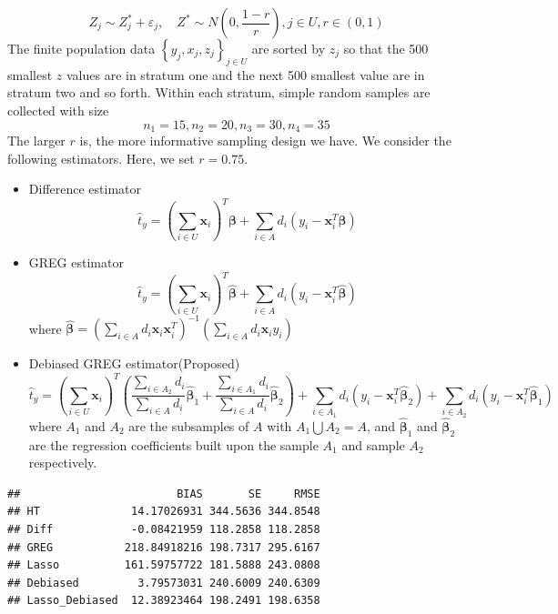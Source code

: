 \documentclass[12pt]{article}
\renewcommand{\bf}[1]{\boldsymbol{\mathbf{#1}}}
\newcommand{\set}[1]{\left\{#1\right\}} %
\newcommand{\pa}[1]{\left(#1\right)} %
\begin{document}
    $$
    Z_j \sim Z_j^* + \varepsilon_j, \quad Z^* \sim N\pa{0, \frac{1 - r}{r}}, j \in U, r \in (0, 1)
    $$
    The finite population data $\set{y_j, x_j, z_j}_{j \in U}$ are sorted by $z_j$ so that the 500 smallest $z$ values are in stratum one and the next 500 smallest value are in stratum two and so forth. Within each stratum, simple random samples are collected with size
    $$
    n_1 = 15, n_2 = 20, n_3 = 30, n_4 = 35
    $$
The larger $r$ is, the more informative sampling design we have. We consider the following estimators. Here, we set $r = 0.75$.

\begin{itemize}
  \item Difference estimator
  $$
  \hat t_y = \pa{\sum_{i \in U}\bf x_i}^T \bf \beta + \sum_{i \in A} d_i \pa{y_i - \bf x_i^T \bf \beta}
  $$
  \item GREG estimator
  $$
  \hat t_y = \pa{\sum_{i \in U}\bf x_i}^T \hat{\bf \beta} + \sum_{i \in A} d_i \pa{y_i - \bf x_i^T \hat{\bf \beta}}
  $$
  where $\hat {\bf \beta} = \pa{\sum_{i \in A} d_i \bf x_i \bf x_i^T}^{-1} \pa{\sum_{i \in A} d_i \bf x_i y_i}$
  
  \item Debiased GREG estimator(Proposed)
    $$
  \hat t_y = \pa{\sum_{i \in U}\bf x_i}^T \pa{ \frac{\sum_{i \in A_2}d_i}{\sum_{i \in A}d_i} \hat{\bf \beta}_1 + \frac{\sum_{i \in A_1}d_i}{\sum_{i \in A}d_i} \hat{\bf \beta}_2} + \sum_{i \in A_1} d_i \pa{y_i - \bf x_i^T \hat{\bf \beta}_2} + \sum_{i \in A_2} d_i \pa{y_i - \bf x_i^T \hat{\bf \beta}_1}
  $$
  where $A_1$ and $A_2$ are the subsamples of $A$ with $A_1 \bigcup A_2 = A$, and $\hat {\bf \beta}_1$ and $\hat {\bf \beta}_2$ are the regression coefficients built upon the sample $A_1$ and sample $A_2$ respectively.
  
\end{itemize}

\begin{verbatim}
##                        BIAS       SE     RMSE
## HT              14.17026931 344.5636 344.8548
## Diff            -0.08421959 118.2858 118.2858
## GREG           218.84918216 198.7317 295.6167
## Lasso          161.59757722 181.5888 243.0808
## Debiased         3.79573031 240.6009 240.6309
## Lasso_Debiased  12.38923464 198.2491 198.6358
\end{verbatim}
\end{document}

